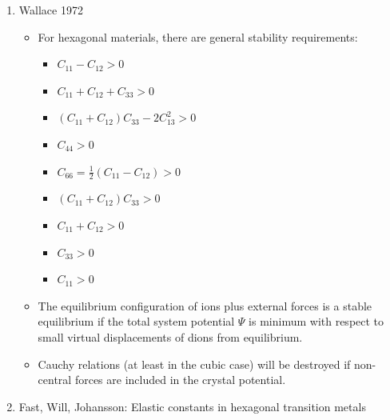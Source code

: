 \documentclass[11pt]{article}
\begin{document}
\begin{enumerate}
\item Wallace 1972
\label{sec:org8695829}
\begin{itemize}
\item For hexagonal materials, there are general stability requirements:
\begin{itemize}
\item \(C_{11} - C_{12} > 0\)
\item \(C_{11} + C_{12} + C_{33} > 0\)
\item \(( C_{11} + C_{12} ) C_{33} - 2C_{13}^{2} > 0\)
\item \(C_{44} > 0\)
\item \(C_{66} = \frac{1}{2}(C_{11} - C_{12}) > 0\)
\item \(( C_{11} + C_{12} )C_{33} > 0\)
\item \(C_{11} + C_{12} > 0\)
\item \(C_{33} > 0\)
\item \(C_{11} > 0\)
\end{itemize}
\item The equilibrium configuration of ions plus external forces is a stable
equilibrium if the total system potential \(\Psi\) is minimum with respect
to small virtual displacements of dions from equilibrium.
\item Cauchy relations (at least in the cubic case) will be destroyed if
non-central forces are included in the crystal potential.
\end{itemize}

\item Fast, Will, Johansson: Elastic constants in hexagonal transition metals
\label{sec:org4f0f7e8}


\end{enumerate}
\end{document}
